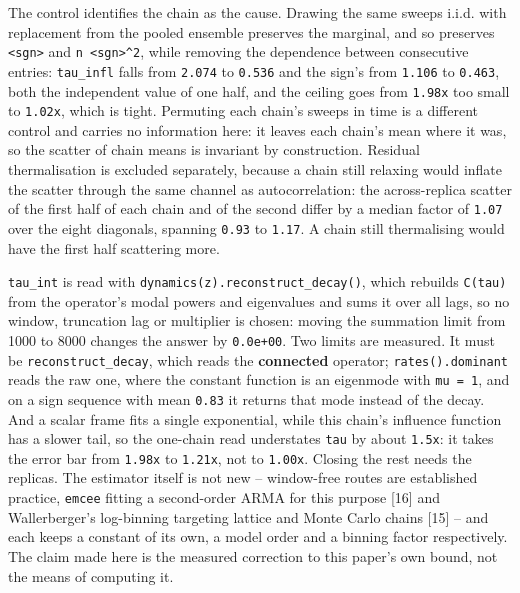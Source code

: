 \documentclass[10pt,letterpaper,twocolumn]{article}
\begin{document}
The control identifies the chain as the cause. Drawing the same sweeps i.i.d.
with replacement from the pooled ensemble preserves the marginal, and so preserves \texttt{\textless{}\allowbreak{}sgn\textgreater{}\allowbreak{}} and
\texttt{n\ \textless{}\allowbreak{}sgn\textgreater{}\allowbreak{}\^{}2}, while removing the dependence between consecutive entries: \texttt{tau\_\allowbreak{}infl} falls from
\texttt{2.\allowbreak{}074} to \texttt{0.\allowbreak{}536} and the sign's from \texttt{1.\allowbreak{}106} to \texttt{0.\allowbreak{}463}, both the independent value of one half,
and the ceiling goes from \texttt{1.\allowbreak{}98x} too small to \texttt{1.\allowbreak{}02x}, which is tight. Permuting each chain's
sweeps in time is a different control and carries no information here: it leaves each chain's mean
where it was, so the scatter of chain means is invariant by construction. Residual thermalisation
is excluded separately, because a chain still relaxing would inflate the
scatter through the same channel as autocorrelation: the across-replica scatter of the first half
of each
chain and of the second differ by a median factor of \texttt{1.\allowbreak{}07} over the eight diagonals, spanning
\texttt{0.\allowbreak{}93} to \texttt{1.\allowbreak{}17}. A chain still thermalising would have the first half scattering more.

\texttt{tau\_\allowbreak{}int} is read with \texttt{dynamics(\allowbreak{}z)\allowbreak{}.\allowbreak{}reconstruct\_\allowbreak{}decay(\allowbreak{})\allowbreak{}}, which rebuilds \texttt{C(\allowbreak{}tau)\allowbreak{}} from the
operator's modal powers and eigenvalues and sums it over all lags, so no window, truncation lag or
multiplier is chosen: moving the summation limit from 1000 to 8000 changes the answer by
\texttt{0.\allowbreak{}0e+\allowbreak{}00}. Two limits are measured. It must be \texttt{reconstruct\_\allowbreak{}decay}, which
reads the \textbf{connected} operator; \texttt{rates(\allowbreak{})\allowbreak{}.\allowbreak{}dominant} reads the raw one, where the constant
function is an eigenmode with \texttt{\textbar{}\allowbreak{}mu\textbar{}\allowbreak{}\ =\allowbreak{}\ 1}, and on a sign sequence with mean \texttt{0.\allowbreak{}83} it returns that
mode instead of the decay. And a scalar frame fits a single exponential, while this chain's
influence function has a slower tail, so the one-chain read understates \texttt{tau} by about \texttt{1.\allowbreak{}5x}: it
takes the error bar from \texttt{1.\allowbreak{}98x} to \texttt{1.\allowbreak{}21x}, not to \texttt{1.\allowbreak{}00x}. Closing the rest needs the replicas.
The estimator itself is not new -- window-free routes are established practice, \texttt{emcee} fitting a
second-order ARMA for this purpose {[}16{]} and Wallerberger's log-binning targeting lattice and Monte
Carlo chains {[}15{]} -- and each keeps a constant of its own, a model order and a binning factor
respectively. The claim made here is the measured correction to this paper's own bound, not the
means of computing it.
\end{document}
